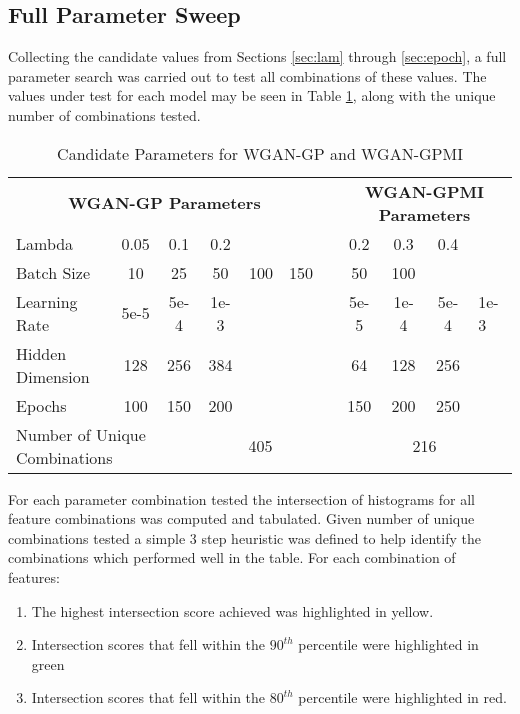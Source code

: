\subsection{Full Parameter Sweep}

Collecting the candidate values from Sections \ref{sec:lam} through \ref{sec:epoch}, a full parameter search was carried out to test all combinations of these values. The values under test for each model may be seen in Table \ref{tab:param_sweep}, along with the unique number of combinations tested.

\begin{table}[!htbp]
	\centering
	\caption{Candidate Parameters for WGAN-GP and WGAN-GPMI}
	\label{tab:param_sweep}
	\begin{tabular}{l|ccccc|l|cccl}
		\cline{1-11}
		\multicolumn{6}{c}{\textbf{WGAN-GP Parameters}} & \multicolumn{1}{l}{} & \multicolumn{4}{c}{\textbf{WGAN-GPMI Parameters}} \\
		\cline{1-11}
		Lambda & 0.05 & 0.1 & 0.2 & & & & 0.2 & 0.3 & 0.4 & \\
		Batch Size & 10 & 25 & 50 & 100 & 150 & & 50 & 100 &  & \\
		Learning Rate & 5e-5 & 5e-4 & 1e-3 & & & & 5e-5 & 1e-4 & 5e-4 & 1e-3 \\
		Hidden Dimension & 128 & 256 & 384 & & & & 64 & 128 & 256 & \\
		Epochs & 100 & 150 & 200 & & & & 150 & 200 & 250 & \\
		\cline{1-11}
		\multicolumn{3}{l|}{Number of Unique Combinations} & \multicolumn{3}{c}{405} & \multicolumn{1}{|l|}{} & \multicolumn{4}{c}{216} \\ \cline{1-11}
	\end{tabular}
\end{table}

For each parameter combination tested the intersection of histograms for all feature combinations was computed and tabulated. Given number of unique combinations tested a simple 3 step heuristic was defined to help identify the combinations which performed well in the table. For each combination of features:

\begin{enumerate}
	\item The highest intersection score achieved was highlighted in yellow.
	\item Intersection scores that fell within the $90^{th}$ percentile were highlighted in green
	\item Intersection scores that fell within the $80^{th}$ percentile were highlighted in red.
\end{enumerate}

